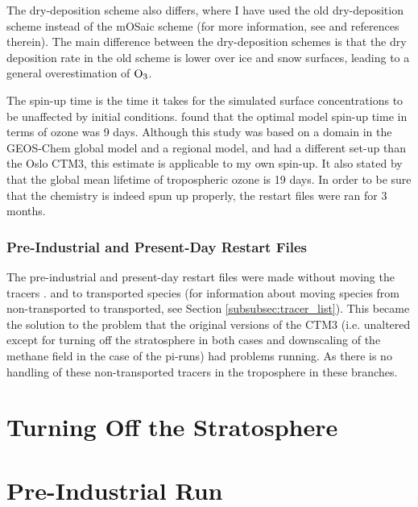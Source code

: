 \medskip


The dry-deposition scheme also differs, where I have used the old dry-deposition scheme instead of the mOSaic scheme (for more information, see \cite{Falk_2019} and references therein). The main difference between the dry-deposition schemes is that the dry deposition rate in the old scheme is lower over ice and snow surfaces, leading to a general overestimation of $\mathrm{O_3}$.


\medskip

The spin-up time is the time it takes for the simulated surface concentrations to be unaffected by initial conditions. \cite{Curci_AirPollution} found that the optimal model spin-up time in terms of ozone was 9 days. Although this study was based on a domain in the GEOS-Chem global model and a regional model, and had a different set-up than the Oslo CTM3, this estimate is applicable to my own spin-up. It also stated by \cite{SeinfeldSpyros} that the global mean lifetime of tropospheric ozone is 19 days. In order to be sure that the chemistry is indeed spun up properly, the restart files were ran for 3 months. 

\subsection{Pre-Industrial and Present-Day Restart Files}\label{sec:PI_and_PD_restart}

The pre-industrial and present-day restart files were made without moving the tracers .  and  to transported species (for information about moving species from non-transported to transported, see Section \ref{subsubsec:tracer_list}). This became the solution to the problem that the original versions of the CTM3 (i.e. unaltered except for turning off the stratosphere in both cases and downscaling of the methane field in the case of the \acrshort{pi}-runs) had problems running. As there is no handling of these non-transported tracers in the troposphere in these branches. 

\cleardoublepage

\chapter{Turning Off the Stratosphere}\label{app:turning_off_the_stratosphere}



\cleardoublepage

\chapter{Pre-Industrial Run}\label{app:PI_run}

